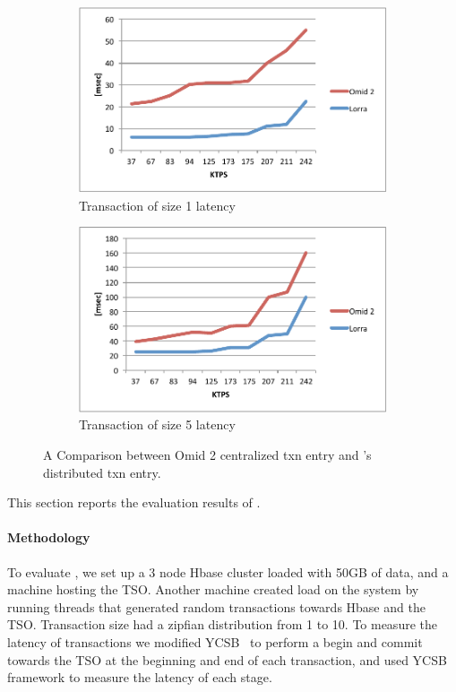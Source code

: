\begin{figure}[!h]
  \centering
  \begin{subfigure}[t]{0.4\textwidth}
	\includegraphics[width=\textwidth]{figs/LL_tx1.pdf}
	\caption[]{Transaction of size 1 latency}
    \label{fig:ll:tx1}
  \end{subfigure}
  \begin{subfigure}[t]{0.4\textwidth}
	\includegraphics[width=\textwidth]{figs/LL_tx5.pdf}
	\caption[]{Transaction of size 5 latency}
    \label{fig:l:tx5}
  \end{subfigure}			
  \caption{A Comparison between Omid 2 centralized txn entry and \sys's distributed txn entry.}
  \label{fig:ll}
\end{figure}



This section reports the evaluation results of \sys.

\paragraph{Methodology}
To evaluate \sys, we set up a 3 node Hbase cluster loaded with 50GB of data, and a machine hosting the TSO.
Another machine created load on the system by running threads that generated random transactions towards Hbase and the TSO. Transaction size had a zipfian distribution from 1 to 10.
To measure the latency of transactions we modified YCSB~\cite{Cooper:2010:BCS:1807128.1807152} to perform a begin and commit towards the TSO at the beginning and end of each transaction, and used YCSB framework to measure the latency of each stage.

